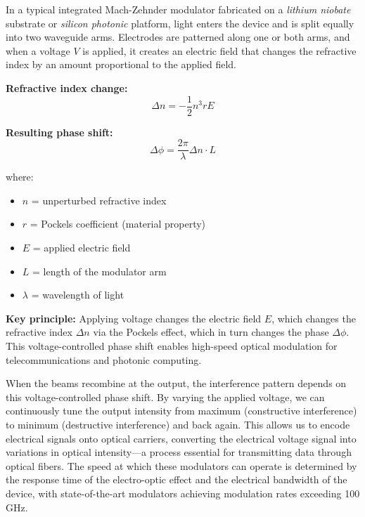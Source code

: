 \documentclass[
  a4paper,
]{book}
\providecommand{\tightlist}{%
  \setlength{\itemsep}{0pt}\setlength{\parskip}{0pt}}
\begin{document}
In a typical integrated Mach-Zehnder modulator fabricated on a
\emph{lithium niobate} substrate or \emph{silicon photonic} platform,
light enters the device and is split equally into two waveguide arms.
Electrodes are patterned along one or both arms, and when a voltage
\(V\) is applied, it creates an electric field that changes the
refractive index by an amount proportional to the applied field.

\begin{tcolorbox}[enhanced jigsaw, breakable, toptitle=1mm, bottomrule=.15mm, colbacktitle=quarto-callout-important-color!10!white, title=\textcolor{quarto-callout-important-color}{\faExclamation}\hspace{0.5em}{Electro-Optic Phase Modulation (Pockels Effect)}, arc=.35mm, rightrule=.15mm, bottomtitle=1mm, opacityback=0, toprule=.15mm, coltitle=black, leftrule=.75mm, opacitybacktitle=0.6, colback=white, left=2mm, titlerule=0mm, colframe=quarto-callout-important-color-frame]

\textbf{Refractive index change:} \[\Delta n = -\frac{1}{2}n^3 r E\]

\textbf{Resulting phase shift:}
\[\Delta \phi = \frac{2\pi}{\lambda} \Delta n \cdot L\]

where:

\begin{itemize}
\tightlist
\item
  \(n\) = unperturbed refractive index
\item
  \(r\) = Pockels coefficient (material property)
\item
  \(E\) = applied electric field
\item
  \(L\) = length of the modulator arm
\item
  \(\lambda\) = wavelength of light
\end{itemize}

\textbf{Key principle:} Applying voltage changes the electric field
\(E\), which changes the refractive index \(\Delta n\) via the Pockels
effect, which in turn changes the phase \(\Delta \phi\). This
voltage-controlled phase shift enables high-speed optical modulation for
telecommunications and photonic computing.

\end{tcolorbox}

When the beams recombine at the output, the interference pattern depends
on this voltage-controlled phase shift. By varying the applied voltage,
we can continuously tune the output intensity from maximum (constructive
interference) to minimum (destructive interference) and back again. This
allows us to encode electrical signals onto optical carriers, converting
the electrical voltage signal into variations in optical intensity---a
process essential for transmitting data through optical fibers. The
speed at which these modulators can operate is determined by the
response time of the electro-optic effect and the electrical bandwidth
of the device, with state-of-the-art modulators achieving modulation
rates exceeding 100 GHz.
\end{document}

